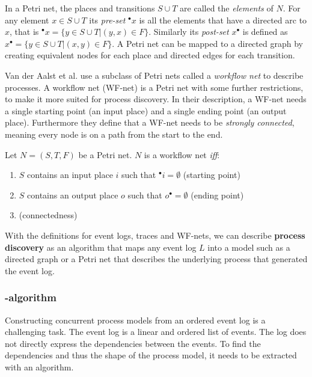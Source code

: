 In a Petri net, the places and transitions $S \cup T$ are called the \emph{elements} of $N$.
For any element $x \in S \cup T$ its \emph{pre-set} ${}^\bullet x$ is all the elements that have a directed arc to $x$, that is ${}^\bullet x = \{y \in S \cup T | (y,x) \in F\}$. Similarly its \emph{post-set} $x^\bullet$ is defined as 
$x^\bullet = \{y \in S \cup T | (x,y) \in F\}$.
A Petri net can be mapped to a directed graph by creating equivalent nodes for each place and directed edges for each transition.

Van der Aalst et al. \cite{van2013discovering} use a subclass of Petri nets called a \emph{workflow net} to describe processes. A workflow net (WF-net) is a Petri net with some further restrictions, to make it more suited for process discovery. In their description, a WF-net needs a single starting point (an input place) and a single ending point (an output place). Furthermore they define that a WF-net needs to be \emph{strongly connected}, meaning every node is on a path from the start to the end.

\begin{definition}
Let $N = (S, T, F)$ be a Petri net. $N$ is a workflow net \emph{iff}:
\begin{enumerate}
    \item $S$ contains an input place $i$ such that ${}^\bullet i = \emptyset$ (starting point)
    \item $S$ contains an output place $o$ such that $o^\bullet = \emptyset$ (ending point)
    \item {} (connectedness)
\end{enumerate}
\end{definition}

With the definitions for event logs, traces and WF-nets, we can describe \textbf{process discovery} as an algorithm that maps any event log $L$ into a model such as a directed graph or a Petri net that describes the underlying process that generated the event log.

\subsubsection{\textalpha-algorithm}
\label{sec:alphaalgorithm}
Constructing concurrent process models from an ordered event log is a challenging task.
The event log is a linear and ordered list of events.
The log does not directly express the dependencies between the events.
To find the dependencies and thus the shape of the process model, it needs to be extracted with an algorithm.

